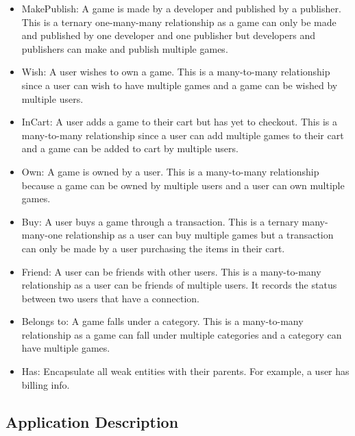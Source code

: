 \documentclass[12pt, oneside]{article}
\begin{document}
\begin{itemize}
    \item MakePublish: A game is made by a developer and published by a publisher. This is a ternary one-many-many relationship as a game can only be made and published by one developer and one publisher but developers and publishers can make and publish multiple games.
    \item Wish: A user wishes to own a game. This is a many-to-many relationship since a user can wish to have multiple games and a game can be wished by multiple users.
    \item InCart: A user adds a game to their cart but has yet to checkout. This is a many-to-many relationship since a user can add multiple games to their cart and a game can be added to cart by multiple users.
    \item Own: A game is owned by a user. This is a many-to-many relationship because a game can be owned by multiple users and a user can own multiple games.
    \item Buy: A user buys a game through a transaction. This is a ternary many-many-one relationship as a user can buy multiple games but a transaction can only be made by a user purchasing the items in their cart.
    \item Friend: A user can be friends with other users. This is a many-to-many relationship as a user can be friends of multiple users. It records the status between two users that have a connection.
    \item Belongs to: A game falls under a category. This is a many-to-many relationship as a game can fall under multiple categories and a category can have multiple games.
    \item Has: Encapsulate all weak entities with their parents. For example, a user has billing info.
\end{itemize}

\subsection{Application Description}
\end{document}
